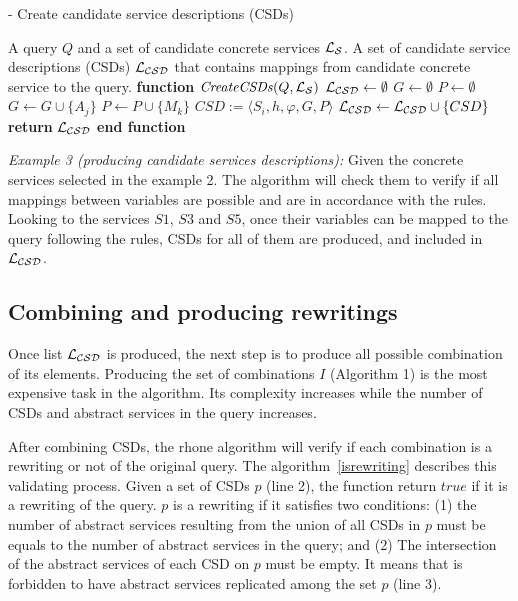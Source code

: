 \begin{algorithm}
\caption{ - Create candidate service descriptions (CSDs)}
\label{creatingcsds}
\begin{algorithmic}[1]
\REQUIRE A query $Q$ and a set of candidate concrete services $\hbox{${\cal L_{S}}$}$.
\ENSURE A set of candidate service descriptions (CSDs) $\hbox{${\cal L_{CSD}}$}$ that contains mappings from candidate concrete service to the query.
\STATE \textbf{function} $\mathit{CreateCSDs} (Q, \hbox{${\cal L_{S}}$})$
\STATE $\hbox{${\cal L_{CSD}}$} \leftarrow \emptyset$
		\STATE $G \leftarrow \emptyset$	
		\STATE $P \leftarrow \emptyset$		
			\STATE $G \leftarrow G \cup \lbrace A_{j} \rbrace$ 
		\ENDFOR
			\STATE $P \leftarrow P \cup \lbrace M_{k} \rbrace$ 
		\ENDFOR
		\STATE $CSD := \langle S_{i}, h, \varphi, G, P \rangle$	
		\STATE $\hbox{${\cal L_{CSD}}$} \leftarrow \hbox{${\cal L_{CSD}}$} \cup \lbrace CSD \rbrace$	
	\ENDIF
\ENDFOR
\STATE \textbf{return} $\hbox{${\cal L_{CSD}}$}$
\STATE \textbf{end function}
\end{algorithmic}
\end{algorithm}

\bigskip
\noindent \textit{Example 3 (producing candidate services descriptions):} 
Given the concrete services selected in the example 2. The algorithm will check them to 
verify if all mappings between variables are possible and are in accordance with the rules. 
Looking to the services $S1$, $S3$ and $S5$, once their variables can be mapped to the
query following the rules, CSDs for all of them are produced, and included in $\hbox{${\cal L_{CSD}}$}$.


\subsection{Combining and producing rewritings}
Once list $\hbox{${\cal L_{CSD}}$}$ is produced, the next step is to produce all possible 
combination of its elements. Producing the set of combinations $I$ (Algorithm 1)
is the most expensive task in the algorithm. Its complexity increases while
the number of CSDs and abstract services in the query increases.

After combining CSDs, the rhone algorithm will verify if each combination
is a rewriting or not of the original query. The algorithm~\ref{isrewriting}
describes this validating process. Given a set of CSDs $p$ (line 2), the function 
return $true$ if it is a rewriting of the query. $p$ is a rewriting if it satisfies
two conditions: (1) the number of abstract services resulting from the union of all 
CSDs in $p$ must be equals to the number of abstract services in the query; and (2)
The intersection of the abstract services of each CSD on $p$ must be empty. 
It means that is forbidden to have abstract services replicated among the set $p$ (line 3).


